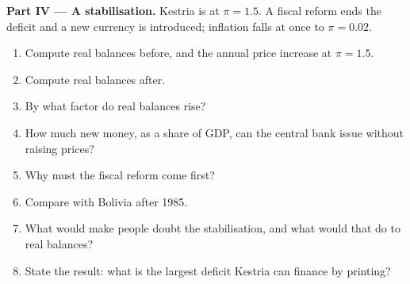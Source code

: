 \begin{problem}
\medskip\noindent\textbf{Part IV --- A stabilisation.} Kestria is at $\pi = 1.5$. A
fiscal reform ends the deficit and a new currency is introduced; inflation
falls at once to $\pi = 0.02$.
\begin{enumerate}[resume]
  \item Compute real balances before, and the annual price increase at $\pi = 1.5$.
  \item Compute real balances after.
  \item By what factor do real balances rise?
  \item How much new money, as a share of GDP, can the central bank issue without raising prices?
  \item Why must the fiscal reform come first?
  \item Compare with Bolivia after 1985.
  \item What would make people doubt the stabilisation, and what would that do to real balances?
  \item State the result: what is the largest deficit Kestria can finance by printing?
\end{enumerate}
\end{problem}
